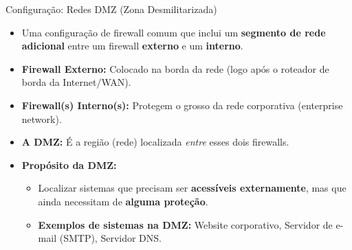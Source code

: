 \begin{frame}{Configuração: Redes DMZ (Zona Desmilitarizada)}
    \begin{itemize}
        \item Uma configuração de firewall comum que inclui um \textbf{segmento de rede adicional} entre um firewall \textbf{externo} e um \textbf{interno}.

        \item \textbf{Firewall Externo:} Colocado na borda da rede (logo após o roteador de borda da Internet/WAN).

        \item \textbf{Firewall(s) Interno(s):} Protegem o grosso da rede corporativa (enterprise network).

        \item \textbf{A DMZ:} É a região (rede) localizada \textit{entre} esses dois firewalls.

        \item \textbf{Propósito da DMZ:}
              \begin{itemize}
                  \item Localizar sistemas que precisam ser \textbf{acessíveis externamente}, mas que ainda necessitam de \textbf{alguma proteção}.
                  \item \textbf{Exemplos de sistemas na DMZ:} Website corporativo, Servidor de e-mail (SMTP), Servidor DNS.
              \end{itemize}
    \end{itemize}
\end{frame}

